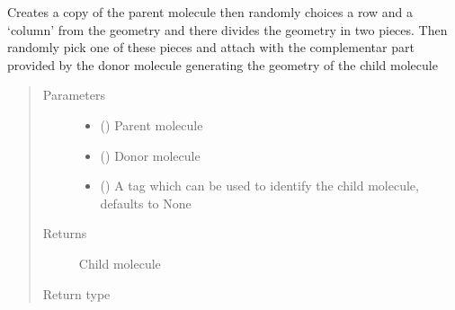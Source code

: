\documentclass[letterpaper,10pt,english]{sphinxmanual}
\begin{document}
\begin{fulllineitems}
\label{\detokenize{MolOpt.molecular:MolOpt.molecular.molecular.crossover_1}}
\sphinxAtStartPar
Creates a copy of the parent molecule then randomly choices a row and a ‘column’ from the geometry and there 
divides the geometry in two pieces. Then randomly pick one of these pieces and attach with the complementar part 
provided by the donor molecule generating the geometry of the child molecule
\begin{quote}\begin{description}
\item[{Parameters}] \leavevmode\begin{itemize}
\item {} 
\sphinxAtStartPar
{} ({\hyperref[\detokenize{MolOpt.molecular:MolOpt.molecular.molecular.Molecule}]{}}) \textendash{} Parent molecule

\item {} 
\sphinxAtStartPar
{} ({\hyperref[\detokenize{MolOpt.molecular:MolOpt.molecular.molecular.Molecule}]{}}) \textendash{} Donor molecule

\item {} 
\sphinxAtStartPar
{} (\sphinxstyleliteralemphasis{\sphinxupquote{, }}) \textendash{} A tag which can be used to identify the child molecule, defaults to None

\end{itemize}

\item[{Returns}] \leavevmode
\sphinxAtStartPar
Child molecule

\item[{Return type}] \leavevmode
\sphinxAtStartPar
{\hyperref[\detokenize{MolOpt.molecular:MolOpt.molecular.molecular.Molecule}]{}}

\end{description}\end{quote}

\end{fulllineitems}
\end{document}
